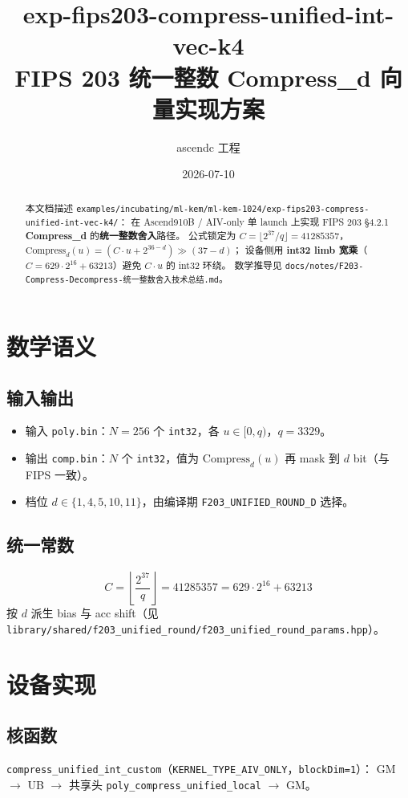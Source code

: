 \documentclass[UTF8,a4paper,11pt]{ctexart}
\title{exp-fips203-compress-unified-int-vec-k4\\FIPS 203 统一整数 Compress\_d 向量实现方案}
\author{ascendc 工程}
\date{2026-07-10}
\begin{document}
\maketitle

\begin{abstract}
本文档描述 \texttt{examples/incubating/ml-kem/ml-kem-1024/exp-fips203-compress-unified-int-vec-k4/}：
在 Ascend910B / AIV-only 单 launch 上实现 FIPS 203 §4.2.1 \textbf{Compress\_d} 的\textbf{统一整数舍入}路径。
公式锁定为 $C=\lfloor 2^{37}/q\rfloor=41285357$，$\text{Compress}_d(u)=(C\cdot u+2^{36-d})\gg(37-d)$；
设备侧用 \textbf{int32 limb 宽乘}（$C=629\cdot 2^{16}+63213$）避免 $C\cdot u$ 的 int32 环绕。
数学推导见 \texttt{docs/notes/F203-Compress-Decompress-统一整数舍入技术总结.md}。
\end{abstract}

\section{数学语义}

\subsection{输入输出}
\begin{itemize}
  \item 输入 \texttt{poly.bin}：$N=256$ 个 \texttt{int32}，各 $u\in[0,q)$，$q=3329$。
  \item 输出 \texttt{comp.bin}：$N$ 个 \texttt{int32}，值为 $\text{Compress}_d(u)$ 再 mask 到 $d$ bit（与 FIPS 一致）。
  \item 档位 $d\in\{1,4,5,10,11\}$，由编译期 \texttt{F203\_UNIFIED\_ROUND\_D} 选择。
\end{itemize}

\subsection{统一常数}
\[
  C = \left\lfloor \frac{2^{37}}{q} \right\rfloor = 41285357 = 629\cdot 2^{16} + 63213
\]
按 $d$ 派生 bias 与 acc shift（见 \texttt{library/shared/f203\_unified\_round/f203\_unified\_round\_params.hpp}）。

\section{设备实现}

\subsection{核函数}
\texttt{compress\_unified\_int\_custom}（\texttt{KERNEL\_TYPE\_AIV\_ONLY}，\texttt{blockDim=1}）：
GM $\rightarrow$ UB $\rightarrow$ 共享头 \texttt{poly\_compress\_unified\_local} $\rightarrow$ GM。
\end{document}
